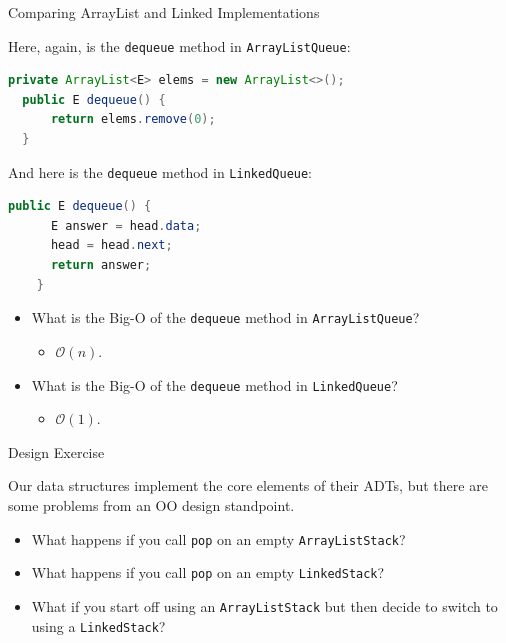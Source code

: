 \documentclass{beamer}
\begin{document}
\begin{frame}[fragile]{Comparing ArrayList and Linked Implementations}


Here, again, is the {\tt dequeue} method in {\tt ArrayListQueue}:
\begin{lstlisting}[language=Java]
  private ArrayList<E> elems = new ArrayList<>();
  public E dequeue() {
      return elems.remove(0);
  }
\end{lstlisting}

And here is the {\tt dequeue} method in {\tt LinkedQueue}:
\begin{lstlisting}[language=Java]
  public E dequeue() {
      E answer = head.data;
      head = head.next;
      return answer;
    }
\end{lstlisting}

\begin{itemize}
\item<1-> What is the Big-O of the {\tt dequeue} method in {\tt ArrayListQueue}?
\begin{itemize}
\item<2-> $\mathcal{O}(n)$.
\end{itemize}
\item<3-> What is the Big-O of the {\tt dequeue} method in {\tt LinkedQueue}?
\begin{itemize}
\item<4-> $\mathcal{O}(1)$.
\end{itemize}
\end{itemize}

\end{frame}

\begin{frame}[fragile]{Design Exercise}


Our data structures implement the core elements of their ADTs, but there are some problems from an OO design standpoint.
\begin{itemize}
\item What happens if you call {\tt pop} on an empty {\tt ArrayListStack}?
\item What happens if you call {\tt pop} on an empty {\tt LinkedStack}?
\item What if you start off using an {\tt ArrayListStack} but then decide to switch to using a {\tt LinkedStack}?
\end{itemize}


\end{frame}
\end{document}
